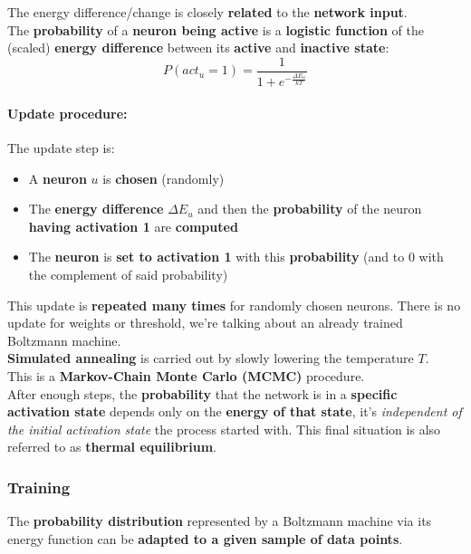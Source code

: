 The energy difference/change is closely \textbf{related} to the \textbf{network input}.\\

The \textbf{probability} of a \textbf{neuron being active} is a \textbf{logistic function} of the (scaled) \textbf{energy difference} between its \textbf{active} and \textbf{inactive state}:
$$ P(act_u = 1) = \frac{1}{1 + e^{- \frac{\Delta E_u}{kT}}} $$

\paragraph{Update procedure:} The update step is:
\begin{itemize}
	\item A \textbf{neuron} $u$ is \textbf{chosen} (randomly)
	\item The \textbf{energy difference} $\Delta E_u$ and then the \textbf{probability} of the neuron \textbf{having activation 1} are \textbf{computed}
	\item The \textbf{neuron} is \textbf{set to activation 1} with this \textbf{probability} (and to 0 with the complement of said probability)
\end{itemize}

This update is \textbf{repeated many times} for randomly chosen neurons. There is no update for weights or threshold, we're talking about an already trained Boltzmann machine.\\

\textbf{Simulated annealing} is carried out by slowly lowering the temperature $T$. \\

This is a \textbf{Markov-Chain Monte Carlo (MCMC)} procedure.\\

After enough steps, the \textbf{probability} that the network is in a \textbf{specific activation state} depends only on the \textbf{energy of that state}, it's \textit{independent of the initial activation state} the process started with. This final situation is also referred to as \textbf{thermal equilibrium}.\\

\newpage

\subsubsection{Training}
The \textbf{probability distribution} represented by a Boltzmann machine via its energy function can be \textbf{adapted to a given sample of data points}.\\

